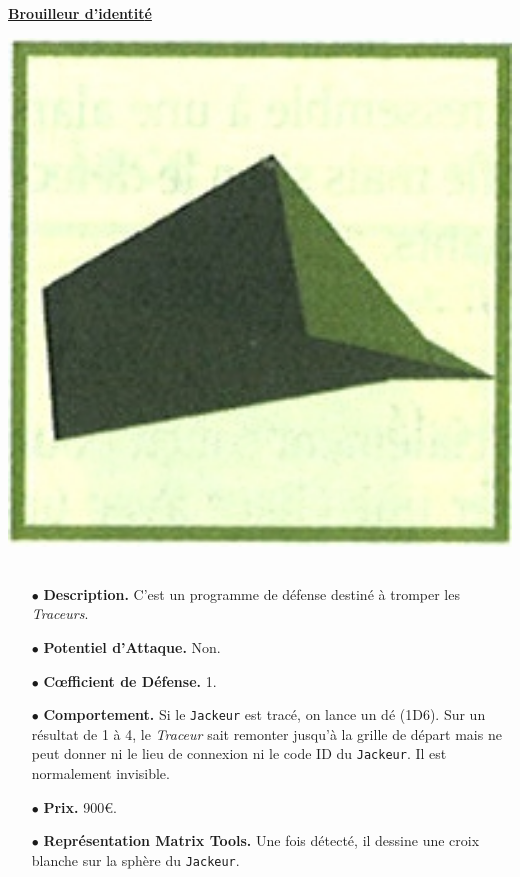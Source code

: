 \documentclass[11pt,twoside,a4paper]{article}
\begin{document}
\begin{multicols*}{2}
\vfill %

\underline{\textbf{Brouilleur d'identit{\'e}}}~\\
\begin{minipage}[h]{0.15\textwidth}
	\includegraphics[width=1.00\textwidth]{img/catalogueProgrammesTraceur.jpg}~\\
\end{minipage} \hfill \begin{minipage}[h]{0.34\textwidth}
	\begin{itemize}
		\item[$\bullet$] \textbf{Description. } C'est un programme de d{\'e}fense destin{\'e} {\`a} tromper les \emph{Traceurs}. 
		\item[$\bullet$] \textbf{Potentiel d'Attaque. }Non. 
		\item[$\bullet$] \textbf{C\oe fficient de D{\'e}fense. }1. 
	\end{itemize}
\end{minipage}
\begin{itemize}
	\item[$\bullet$] \textbf{Comportement. }Si le \texttt{Jackeur} est trac{\'e}, on lance un d{\'e} (1D6). Sur un r{\'e}sultat de 1 {\`a} 4, le \emph{Traceur} sait remonter jusqu'{\`a} la grille de d{\'e}part mais ne peut donner ni le lieu de connexion ni le code ID du \texttt{Jackeur}. Il est normalement invisible. 
	\item[$\bullet$] \textbf{Prix. }900\euro . 
	\item[$\bullet$] \textbf{Repr{\'e}sentation Matrix Tools. }Une fois d{\'e}tect{\'e}, il dessine une croix blanche sur la sph{\`e}re du \texttt{Jackeur}. 
\end{itemize} %


\end{multicols*}
\end{document}
